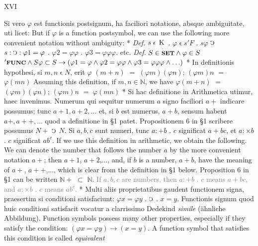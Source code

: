 \documentclass{book}
\newcommand{\s}{\switchcolumn} %
\newcommand{\C}{\mathop{\sbox0{$\displaystyle$$\reflectbox{C}$} %
\raisebox{-\height+\ht0-0.05cm}[\ht0][\dp0]{\scalebox{0.8}[0.8]{\copy0}}}\displaylimits} %
\newcommand{\smallIn}{\ensuremath{\mathrel{\epsilon}}}
\newcommand{\K}{\mathop{\thinspace \text{K} \thinspace}}
\newcommand{\setOfSets}{\mathord{\text{{\footnotesize \textbf{SET}}}}}
\newcommand{\func}{\mathord{\text{{\footnotesize \textbf{FUNC}}}}}
\newcommand\irrelavent[1]{\textcolor{gray}{#1}}
\newcommand{\peanoPage}[1]{\vspace{1ex}

  \columnratio{0.475, 0.05, 0.475} \begin{paracol}{3} \centering \hdashrule{\columnwidth}{0.1mm}{0.1mm 1mm} \s #1 \s \hdashrule{\columnwidth}{0.1mm}{0.1mm 1mm} \end{paracol}

\vspace{1ex}}
\newenvironment{translateTwoCol}
               { %
                 \columnratio{0.5, 0.5} \begin{paracol}{2}
                 \newcommand{\LAT}{\switchcolumn[0]*}
                 \newcommand{\ENG}{\switchcolumn[1]}
               }
               { %
                 \let\ENG\undefined
                 \let\LAT\undefined
                 \end{paracol}
               }
\begin{document}
\peanoPage{XVI} %

\begin{translateTwoCol}
Si vero $\varphi$ est functionis postsignum, ha faciliori notatione, absque ambiguitate, uti licet:
\ENG
But if $\varphi$ is a function postsymbol, we can use the following more convenient notation without ambiguity:
\LAT
\emph{Def.} \hspace{0.25cm} $s \smallIn \K$ . $\varphi \smallIn s 'F$ . $s \varphi$ $\C$ $s : \C : \varphi 1 = \varphi$ . $\varphi 2 = \varphi \varphi$ . $\varphi 3 = \varphi \varphi \varphi$. etc.
\ENG
\emph{Def.} \hspace{0.25cm} $S \in \setOfSets \wedge \varphi \in S$ $'\func \wedge S \varphi \subset S \rightarrow ( \varphi 1 = \varphi \wedge \varphi 2 = \varphi \varphi \wedge \varphi 3 = \varphi \varphi \varphi \wedge \ldots)$
\LAT
In definitionis hypothesi, si $m, n \smallIn N$, erit $\varphi$ $(m+n)$ $=$ $(\varphi m)(\varphi n)$; $(\varphi m)n$ $=$ $\varphi (m n)$
\ENG
Assuming this definition, if $m, n \in \mathbb{N}$, we have $\varphi(m+n)$ $=$ $(\varphi m)(\varphi n)$; $(\varphi m)n$ $=$ $\varphi (m n)$
\LAT
Si hac definitione in Arithmetica utimur, haec invenimus. Numerum qui sequitur numerum $a$ signo faciliori $a +$ indicare possumus; tunc $a + 1, a+2,...$ et, si $b$ est numerus, $a + b$, sensum habent $a +, a + +,...$ quod a definitione in \S 1 patet. Propositionem 6 in \S 1 scribere possumus $N +$ $\C$ $N$. Si $a, b, c$ sunt numeri, tunc $a : + b$ . $c$ significat $a + b c$, et $a : \times b$ . $c$ significat $a b^c$.
\ENG
If we use this definition in arithmetic, we obtain the following. We can denote the number that follows the number $a$ by the more convenient notation $a+$; then $a + 1$, $a + 2$,..., and, if $b$ is a number, $a + b$, have the meaning of $a +$, $a ++$,..., which is clear from the definition in \S 1 below. Proposition 6 in \S 1 can be written $\mathbb{N} +$ $\subset$ $\mathbb{N}$. \irrelavent{If $a, b, c$ are numbers, then $a : + b$ . $c$ means $a + b c$, and $a : \times b$ . $c$ means $a b^c$.} %
\LAT
Multi aliis proprietatibus gaudent functionem signa, praesertim si conditioni satisfaciunt: $\varphi x = \varphi y$ . $\C$ . $x = y$. Functionis signum quod huic conditioni satisfacit vocatur a clarrissimo Dedekind \emph{simile} (\"ahnliche Abbildung).
\ENG
Function symbols possess many other properties, especially if they satisfy the condition: $(\varphi x = \varphi y) \rightarrow (x = y)$. A function symbol that satisfies this condition is called \emph{equivalent}
\end{translateTwoCol}
\end{document}
